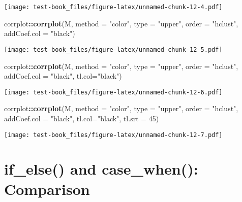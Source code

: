 \documentclass[]{book}
\newenvironment{Shaded}{\begin{snugshade}}{\end{snugshade}}
\newcommand{\DataTypeTok}[1]{\textcolor[rgb]{0.13,0.29,0.53}{#1}}
\newcommand{\DecValTok}[1]{\textcolor[rgb]{0.00,0.00,0.81}{#1}}
\newcommand{\KeywordTok}[1]{\textcolor[rgb]{0.13,0.29,0.53}{\textbf{#1}}}
\newcommand{\NormalTok}[1]{#1}
\newcommand{\OperatorTok}[1]{\textcolor[rgb]{0.81,0.36,0.00}{\textbf{#1}}}
\newcommand{\StringTok}[1]{\textcolor[rgb]{0.31,0.60,0.02}{#1}}
\begin{document}
\texttt{[image: test-book\_files/figure-latex/unnamed-chunk-12-4.pdf]}

\begin{Shaded}
\begin{Highlighting}[]
\NormalTok{corrplot}\OperatorTok{::}\KeywordTok{corrplot}\NormalTok{(M, }\DataTypeTok{method =} \StringTok{"color"}\NormalTok{, }\DataTypeTok{type =} \StringTok{"upper"}\NormalTok{, }\DataTypeTok{order =} \StringTok{"hclust"}\NormalTok{, }\DataTypeTok{addCoef.col =} \StringTok{"black"}\NormalTok{)}
\end{Highlighting}
\end{Shaded}

\texttt{[image: test-book\_files/figure-latex/unnamed-chunk-12-5.pdf]}

\begin{Shaded}
\begin{Highlighting}[]
\NormalTok{corrplot}\OperatorTok{::}\KeywordTok{corrplot}\NormalTok{(M, }\DataTypeTok{method =} \StringTok{"color"}\NormalTok{, }\DataTypeTok{type =} \StringTok{"upper"}\NormalTok{, }\DataTypeTok{order =} \StringTok{"hclust"}\NormalTok{, }\DataTypeTok{addCoef.col =} \StringTok{"black"}\NormalTok{, }\DataTypeTok{tl.col=}\StringTok{"black"}\NormalTok{)}
\end{Highlighting}
\end{Shaded}

\texttt{[image: test-book\_files/figure-latex/unnamed-chunk-12-6.pdf]}

\begin{Shaded}
\begin{Highlighting}[]
\NormalTok{corrplot}\OperatorTok{::}\KeywordTok{corrplot}\NormalTok{(M, }\DataTypeTok{method =} \StringTok{"color"}\NormalTok{, }\DataTypeTok{type =} \StringTok{"upper"}\NormalTok{, }\DataTypeTok{order =} \StringTok{"hclust"}\NormalTok{, }\DataTypeTok{addCoef.col =} \StringTok{"black"}\NormalTok{, }\DataTypeTok{tl.col=}\StringTok{"black"}\NormalTok{, }\DataTypeTok{tl.srt =} \DecValTok{45}\NormalTok{)}
\end{Highlighting}
\end{Shaded}

\texttt{[image: test-book\_files/figure-latex/unnamed-chunk-12-7.pdf]}

\hypertarget{if_else-and-case_when-comparison}{%
\chapter{if\_else() and case\_when(): Comparison}\label{if_else-and-case_when-comparison}}
\end{document}
